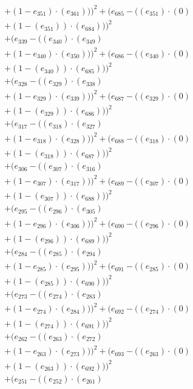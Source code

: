 \documentclass[10pt, a4paper]{article}
\begin{document}
\begin{small}
\begin{align*}
& + (1 - e_{351})  \cdot  (e_{361})))^{2} + (e_{685} - ((e_{351}) \cdot (0) \\
& + (1 - (e_{351})) \cdot (e_{684})))^{2} \\
& + (e_{339} - ((e_{340})  \cdot  (e_{349}) \\
& + (1 - e_{340})  \cdot  (e_{350})))^{2} + (e_{686} - ((e_{340}) \cdot (0) \\
& + (1 - (e_{340})) \cdot (e_{685})))^{2} \\
& + (e_{328} - ((e_{329})  \cdot  (e_{338}) \\
& + (1 - e_{329})  \cdot  (e_{339})))^{2} + (e_{687} - ((e_{329}) \cdot (0) \\
& + (1 - (e_{329})) \cdot (e_{686})))^{2} \\
& + (e_{317} - ((e_{318})  \cdot  (e_{327}) \\
& + (1 - e_{318})  \cdot  (e_{328})))^{2} + (e_{688} - ((e_{318}) \cdot (0) \\
& + (1 - (e_{318})) \cdot (e_{687})))^{2} \\
& + (e_{306} - ((e_{307})  \cdot  (e_{316}) \\
& + (1 - e_{307})  \cdot  (e_{317})))^{2} + (e_{689} - ((e_{307}) \cdot (0) \\
& + (1 - (e_{307})) \cdot (e_{688})))^{2} \\
& + (e_{295} - ((e_{296})  \cdot  (e_{305}) \\
& + (1 - e_{296})  \cdot  (e_{306})))^{2} + (e_{690} - ((e_{296}) \cdot (0) \\
& + (1 - (e_{296})) \cdot (e_{689})))^{2} \\
& + (e_{284} - ((e_{285})  \cdot  (e_{294}) \\
& + (1 - e_{285})  \cdot  (e_{295})))^{2} + (e_{691} - ((e_{285}) \cdot (0) \\
& + (1 - (e_{285})) \cdot (e_{690})))^{2} \\
& + (e_{273} - ((e_{274})  \cdot  (e_{283}) \\
& + (1 - e_{274})  \cdot  (e_{284})))^{2} + (e_{692} - ((e_{274}) \cdot (0) \\
& + (1 - (e_{274})) \cdot (e_{691})))^{2} \\
& + (e_{262} - ((e_{263})  \cdot  (e_{272}) \\
& + (1 - e_{263})  \cdot  (e_{273})))^{2} + (e_{693} - ((e_{263}) \cdot (0) \\
& + (1 - (e_{263})) \cdot (e_{692})))^{2} \\
& + (e_{251} - ((e_{252})  \cdot  (e_{261}) \\

\end{align*}
\end{small}
\end{document}
